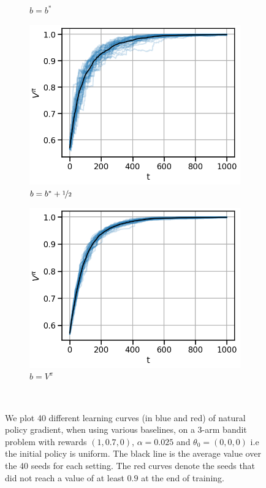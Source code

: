 \begin{figure}[!ht]
\begin{subfigure}[b]{0.245\linewidth}
    \caption{$b = b^\ast$}
  \end{subfigure}
  \begin{subfigure}[b]{0.245\linewidth}
    \includegraphics[width=\textwidth]{articles/baselines/figs/appendix_figs_3arm_000/natural_minvar_05_eta=0025.png}
    \caption{$b = b^\ast + \nicefrac{1}{2}$}
  \end{subfigure}
  \begin{subfigure}[b]{0.245\linewidth}
    \includegraphics[width=\textwidth]{articles/baselines/figs/appendix_figs_3arm_000/natural_value_0_eta=0025.png}
    \caption{$b=V^\pi$}
  \end{subfigure}
  \caption{We plot 40 different learning curves (in blue and red) of natural policy gradient, when using various baselines, on a 3-arm bandit problem with rewards $(1, 0.7, 0)$, $\alpha = 0.025$ and $\theta_0 = (0, 0, 0)$ i.e the initial policy is uniform. The black line is the average value over the 40 seeds for each setting. The red curves denote the seeds that did not reach a value of at least $0.9$ at the end of training.}~\label{appfig:learning_curves_npg_000}
\end{figure}
